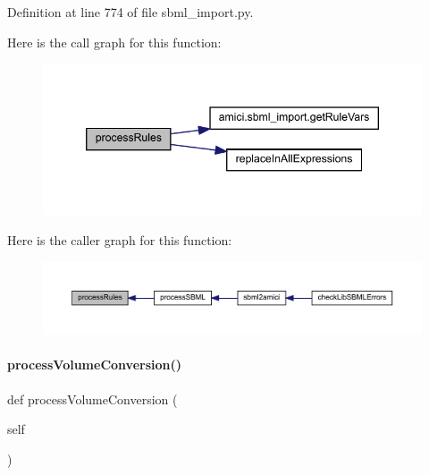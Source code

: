 Definition at line 774 of file sbml\+\_\+import.\+py.

Here is the call graph for this function\+:
\nopagebreak
\begin{figure}[H]
\begin{center}
\leavevmode
\includegraphics[width=346pt]{classamici_1_1sbml__import_1_1_sbml_importer_a7df6b4ae4e3e757bc8de5e0cc54fe16b_cgraph}
\end{center}
\end{figure}
Here is the caller graph for this function\+:
\nopagebreak
\begin{figure}[H]
\begin{center}
\leavevmode
\includegraphics[width=350pt]{classamici_1_1sbml__import_1_1_sbml_importer_a7df6b4ae4e3e757bc8de5e0cc54fe16b_icgraph}
\end{center}
\end{figure}
\mbox{\label{classamici_1_1sbml__import_1_1_sbml_importer_af2a2cbf8550d30fc0e95a875758b8262}} 
\paragraph{\texorpdfstring{process\+Volume\+Conversion()}{processVolumeConversion()}}
{\footnotesize\ttfamily def process\+Volume\+Conversion (\begin{DoxyParamCaption}\item[{}]{self }\end{DoxyParamCaption})}

